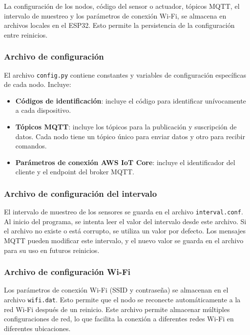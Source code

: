 La configuración de los nodos, código del sensor o actuador, tópicos MQTT, el
intervalo de muestreo y los parámetros de conexión Wi-Fi, se almacena en
archivos locales en el ESP32. Esto permite la persistencia de la configuración
entre reinicios.

\subsubsection{Archivo de configuración}

El archivo \texttt{config.py} contiene constantes y variables de configuración
específicas de cada nodo. Incluye:
\begin{itemize}
    \item \textbf{Códigos de identificación}: incluye el código para identificar unívocamente
          a cada dispositivo.
    \item \textbf{Tópicos MQTT}: incluye los tópicos para la publicación y
          suscripción de datos. Cada nodo tiene un tópico único para enviar datos
          y otro para recibir comandos.
    \item \textbf{Parámetros de conexión AWS IoT Core}: incluye el identificador del cliente y el
          endpoint del broker MQTT.
\end{itemize}

\subsubsection{Archivo de configuración del intervalo}

El intervalo de muestreo de los sensores se guarda en el archivo
\texttt{interval.conf}. Al inicio del programa, se intenta leer el valor del
intervalo desde este archivo. Si el archivo no existe o está corrupto, se
utiliza un valor por defecto. Los mensajes MQTT pueden modificar este
intervalo, y el nuevo valor se guarda en el archivo para su uso en futuros
reinicios.

\subsubsection{Archivo de configuración Wi-Fi}

Los parámetros de conexión Wi-Fi (SSID y contraseña) se almacenan en el archivo
\texttt{wifi.dat}. Esto permite que el nodo se reconecte automáticamente a la
red Wi-Fi después de un reinicio. Este archivo permite almacenar múltiples
configuraciones de red, lo que facilita la conexión a diferentes redes Wi-Fi en
diferentes ubicaciones.

